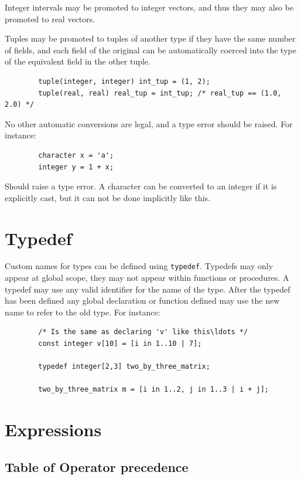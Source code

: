 \documentclass{article}
\begin{document}
	Integer intervals may be promoted to integer vectors, and thus they may also be promoted to real vectors.

	Tuples may be promoted to tuples of another type if they have the same number of fields, and each field of the
	original can be automatically coerced into the type of the equivalent field in the other tuple.

	\begin{lstlisting}
		tuple(integer, integer) int_tup = (1, 2);
		tuple(real, real) real_tup = int_tup; /* real_tup == (1.0, 2.0) */
	\end{lstlisting}

	No other automatic conversions are legal, and a type error should be raised.  For instance:

	\begin{lstlisting}
		character x = 'a';
		integer y = 1 + x;
	\end{lstlisting}

	Should raise a type error. A character can be converted to an integer if it is explicitly cast, but it can not be
	done implicitly like this.


\section{Typedef}\label{sec:typedef}

	Custom names for types can be defined using \texttt{typedef}. Typedefs may only appear at global scope, they may not
	appear within functions or procedures. A typedef may use any valid identifier for the name of the type. After the
	typedef has been defined any global declaration or function defined may use the new name to refer to the old type.
	For instance:

	\begin{lstlisting}
		/* Is the same as declaring 'v' like this\ldots */
		const integer v[10] = [i in 1..10 | 7];

		typedef integer[2,3] two_by_three_matrix;

		two_by_three_matrix m = [i in 1..2, j in 1..3 | i + j];
	\end{lstlisting}


\section{Expressions}\label{sec:expressions}

	\subsection{Table of Operator precedence}\label{sec:operators}
\end{document}
